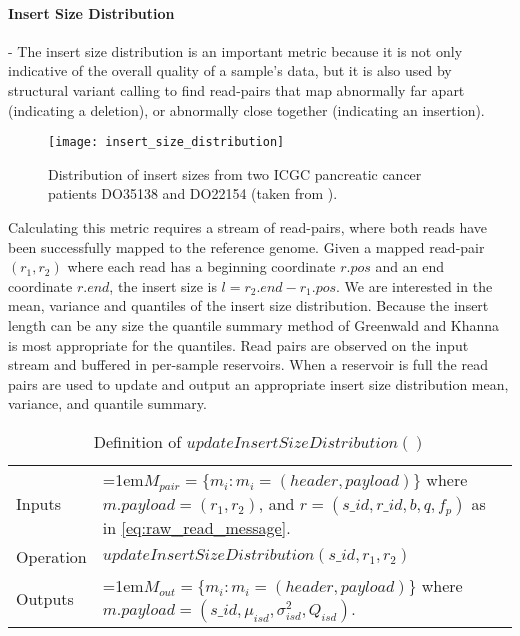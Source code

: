 \paragraph{Insert Size Distribution} - The insert size distribution is an important metric because it is not only indicative of the overall quality of a sample's data, but it is also used by structural variant calling to find read-pairs that map abnormally far apart (indicating a deletion), or abnormally close together (indicating an insertion). 

\begin{figure}[H]
    \texttt{[image: insert\_size\_distribution]}
    \centering
    \caption {Distribution of insert sizes from two ICGC pancreatic cancer patients DO35138 and DO22154 (taken from \autocite{stephens2016simulating}).}
    \label{fig:insert_size_distribution}
\end{figure} 

Calculating this metric requires a stream of read-pairs, where both reads have been successfully mapped to the reference genome. Given a mapped read-pair $(r_1,r_2)$ where each read has a beginning coordinate $r.pos$ and an end coordinate $r.end$, the insert size is $l = r_2.end - r_1.pos$. We are interested in the mean, variance and quantiles of the insert size distribution. Because the insert length can be any size the quantile summary method of Greenwald and Khanna\autocite{greenwald2001space} is most appropriate for the quantiles. Read pairs are observed on the input stream and buffered in per-sample reservoirs. When a reservoir is full the read pairs are used to update and output an appropriate insert size distribution mean, variance, and quantile summary.

\bgroup
\def\arraystretch{1.5}
\begin{table}[!ht]
    \caption{Definition of $updateInsertSizeDistribution()$}
    \label{tab:op_update_insert_size_dist}
    {\begin{tabular}{l|p{12cm}}
    \toprule
    Inputs & \hangindent=1em$M_{pair} = \{m_i: m_i = (header, payload)\}$ where $m.payload = (r_1,r_2)$, and $r = (s\_id, r\_id, b, q, f_p)$ as in \ref{eq:raw_read_message}. \\
    \cline{2-2}
    Operation & $updateInsertSizeDistribution(s\_id,r_1, r_2)$\\
    \cline{2-2}
    {Outputs} & \hangindent=1em$M_{out} = \{m_i: m_i = (header, payload)\}$ where $m.payload = (s\_id, \mu_{isd}, \sigma_{isd}^2, Q_{isd})$.\\
    \bottomrule
    \end{tabular}}
\end{table}
\egroup

